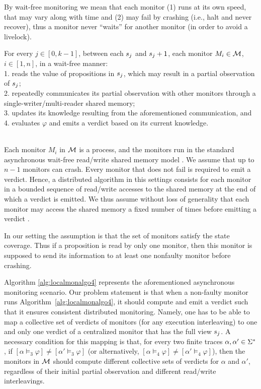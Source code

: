\begin{definition}
\label{def:wait-free}
By wait-free monitoring we mean that each monitor (1) runs at its own speed, that may vary along with time and (2) may fail by crashing (i.e., halt and never recover), thus a monitor never “waits” for another monitor (in order to avoid a livelock).
\end{definition}


For every $j \in [0, k-1]$, between each $s_j$ and $s_j+1$, each monitor $M_i \in \mathcal{M}$, $i \in 
[1, n]$, in a wait-free manner: \\ 1. reads the value of propositions in $s_j$, which may result in a partial observation of $s_j$;\\
2. repeatedly communicates its partial observation with other monitors through a single-writer/multi-reader shared memory; \\
3. updates its knowledge resulting from the aforementioned communication, and \\
4. evaluates $\varphi$ and emits a verdict based on its current knowledge. \\


 \ \



Each monitor $M_i$ in $\mathcal{M}$ is a process, and the monitors run in the standard asynchronous wait-free read/write shared memory model \cite{aw04}. We assume that up to $n-1$ monitors can crash. Every monitor that does not fail is required to emit a verdict. Hence, a distributed algorithm in this settings consists for each monitor in a bounded sequence of read/write accesses to the shared memory at the end of which a verdict is emitted. We thus assume without loss of generality that each monitor may access the shared memory a fixed number of times before emitting a verdict \cite{hkr13, bfrrt16}. 

In our setting the assumption is that the set of monitors satisfy the state coverage. Thus if a proposition is read by only one monitor, then this monitor is supposed to send its information to at least one nonfaulty monitor before crashing. 

Algorithm \ref{alg:localmonalgo4} represents the aforementioned asynchronous monitoring scenario. Our problem statement is that when a non-faulty monitor runs Algorithm~\ref{alg:localmonalgo4}, it should compute and emit a verdict such that it ensures consistent distributed monitoring. Namely, one has to be able to map a collective set of verdicts of monitors (for any execution interleaving) to one and only one verdict of a centralized monitor that has the full view $s_j$. A necessary condition for this mapping is that, for every two finite traces  $\alpha, \alpha' \in \Sigma^\ast$, if $[\alpha \models_3 \varphi] \neq [\alpha' \models_3 \varphi] $ (or alternatively, $[\alpha \models_4 \varphi] \neq [\alpha' \models_4 \varphi] $), then the monitors in $\mathcal{M}$ should compute different collective sets of verdicts for $\alpha$ and $\alpha'$, regardless of their initial partial observation and different read/write interleavings.


